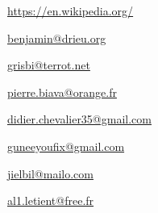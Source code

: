 \urldef{\urlWikipedia}%
\url{https://en.wikipedia.org/}






\urldef{\urlBenjaminDrieuEmail}%
\url{benjamin@drieu.org}     %



\urldef{\urlFrancoisTerrotEmail}%
\url{grisbi@terrot.net}     %


\urldef{\urlPierreBiavaEmail}%
\url{pierre.biava@orange.fr}     %

\urldef{\urlDidierChevalierEmail}%
\url{didier.chevalier35@gmail.com}     %

\urldef{\urlWilliamOllivierEmail}%
\url{guneeyoufix@gmail.com}     %


\urldef{\urlJeanLucDuflotEmail}%
\url{jielbil@mailo.com}     %

\urldef{\urlAlainLetientEmail}%
\url{al1.letient@free.fr}     %


